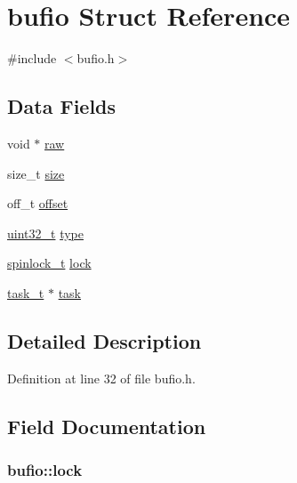 \hypertarget{structbufio}{\section{bufio Struct Reference}
\label{structbufio}
}


{\ttfamily \#include $<$bufio.\+h$>$}

\subsection*{Data Fields}
\begin{DoxyCompactItemize}
\item 
void $\ast$ \hyperlink{structbufio_a7d5a293fbae342f7f9da0390aa04d74a}{raw}
\item 
size\+\_\+t \hyperlink{structbufio_a233f5f8090a3f39d9471333db439e2bb}{size}
\item 
off\+\_\+t \hyperlink{structbufio_a0f3f80e49eba1806c7468d2283083ea0}{offset}
\item 
\hyperlink{aplus_8h_a53a0df51603c77c2aa5b9ea61b606a82}{uint32\+\_\+t} \hyperlink{structbufio_ad5542b6d1da521611e9d5790a4a9e651}{type}
\item 
\hyperlink{spinlock_8h_a7d562148dafb0dacf0ee876d482ed090}{spinlock\+\_\+t} \hyperlink{structbufio_acaf54fa3069ec8ccc9362b1527a1a72c}{lock}
\item 
\hyperlink{task_8h_a8aeef2cdb643462b97cd459a8e68cad3}{task\+\_\+t} $\ast$ \hyperlink{structbufio_a27683bf934579d5f42529dcea191db50}{task}
\end{DoxyCompactItemize}


\subsection{Detailed Description}


Definition at line 32 of file bufio.\+h.



\subsection{Field Documentation}
\hypertarget{structbufio_acaf54fa3069ec8ccc9362b1527a1a72c}{
\subsubsection[{lock}]{ bufio\+::lock}}\label{structbufio_acaf54fa3069ec8ccc9362b1527a1a72c}


